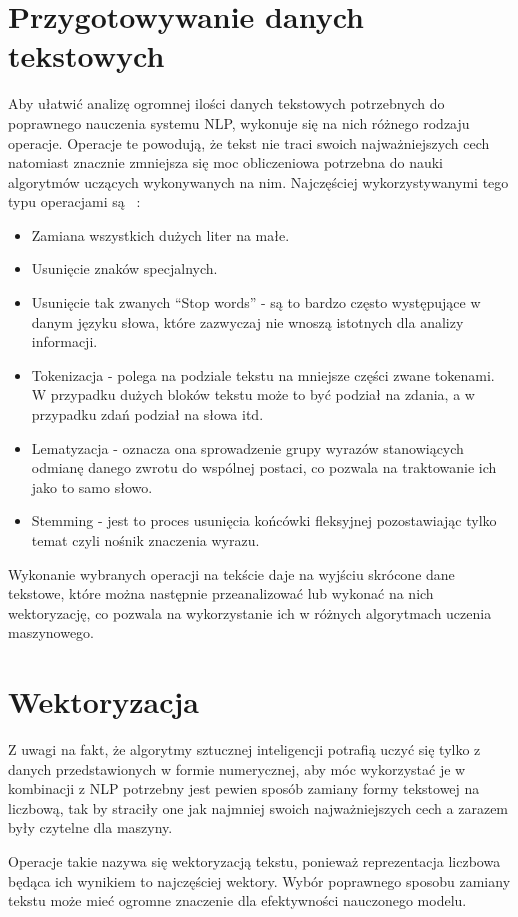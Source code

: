 \section{Przygotowywanie danych tekstowych}
Aby ułatwić analizę ogromnej ilości danych tekstowych potrzebnych do poprawnego nauczenia systemu NLP,
wykonuje się na nich różnego rodzaju operacje. Operacje te powodują, że tekst nie traci swoich najważniejszych cech 
natomiast znacznie zmniejsza się moc obliczeniowa potrzebna do nauki algorytmów uczących wykonywanych na nim. 
Najczęściej wykorzystywanymi tego typu operacjami są ~\cite{preprocessing}:
\begin{itemize}
    \item Zamiana wszystkich dużych liter na małe.
    \item Usunięcie znaków specjalnych.
    \item Usunięcie tak zwanych ``Stop words'' - są to bardzo często występujące w danym języku słowa, które 
    zazwyczaj nie wnoszą istotnych dla analizy informacji.
    \item Tokenizacja - polega na podziale tekstu na mniejsze części zwane tokenami. W przypadku dużych bloków 
    tekstu może to być podział na zdania, a w przypadku zdań podział na słowa itd.
    \item Lematyzacja - oznacza ona sprowadzenie grupy wyrazów stanowiących odmianę danego zwrotu do wspólnej postaci,
    co pozwala na traktowanie ich jako to samo słowo.
    \item Stemming - jest to proces usunięcia końcówki fleksyjnej pozostawiając tylko temat czyli nośnik znaczenia 
    wyrazu.
\end{itemize}
Wykonanie wybranych operacji na tekście daje na wyjściu skrócone dane tekstowe, które można następnie przeanalizować lub 
wykonać na nich wektoryzację, co pozwala na wykorzystanie ich w różnych algorytmach uczenia maszynowego. 
\section{Wektoryzacja}
Z uwagi na fakt, że algorytmy sztucznej inteligencji potrafią uczyć się tylko z danych przedstawionych w formie numerycznej, aby móc 
wykorzystać je w kombinacji z NLP potrzebny jest pewien sposób zamiany formy tekstowej na liczbową, tak by straciły one jak najmniej
swoich najważniejszych cech a zarazem były czytelne dla maszyny. 

Operacje takie nazywa się wektoryzacją tekstu, ponieważ 
reprezentacja liczbowa będąca ich wynikiem to najczęściej wektory. 
Wybór poprawnego sposobu zamiany tekstu może mieć ogromne znaczenie dla efektywności nauczonego modelu.

